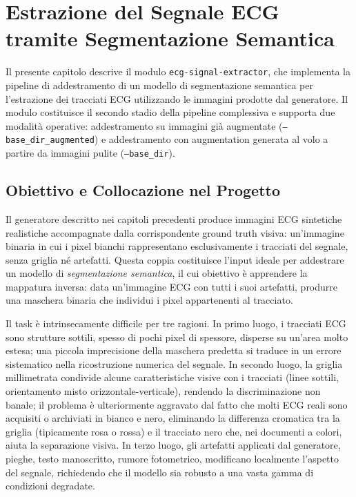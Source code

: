 \chapter{Estrazione del Segnale ECG tramite Segmentazione Semantica}

Il presente capitolo descrive il modulo \texttt{ecg-signal-extractor}, che implementa la pipeline di addestramento di un modello di segmentazione semantica per l'estrazione dei tracciati ECG utilizzando le immagini prodotte dal generatore. Il modulo costituisce il secondo stadio della pipeline complessiva e supporta due modalità operative: addestramento su immagini già augmentate (\texttt{--base\_dir\_augmented}) e addestramento con augmentation generata al volo a partire da immagini pulite (\texttt{--base\_dir}).

\section{Obiettivo e Collocazione nel Progetto}

Il generatore descritto nei capitoli precedenti produce immagini ECG sintetiche realistiche accompagnate dalla corrispondente ground truth visiva: un'immagine binaria in cui i pixel bianchi rappresentano esclusivamente i tracciati del segnale, senza griglia né artefatti. Questa coppia costituisce l'input ideale per addestrare un modello di \textit{segmentazione semantica}, il cui obiettivo è apprendere la mappatura inversa: data un'immagine ECG con tutti i suoi artefatti, produrre una maschera binaria che individui i pixel appartenenti al tracciato.

Il task è intrinsecamente difficile per tre ragioni. In primo luogo, i tracciati ECG sono strutture sottili, spesso di pochi pixel di spessore, disperse su un'area molto estesa; una piccola imprecisione della maschera predetta si traduce in un errore sistematico nella ricostruzione numerica del segnale. In secondo luogo, la griglia millimetrata condivide alcune caratteristiche visive con i tracciati (linee sottili, orientamento misto orizzontale-verticale), rendendo la discriminazione non banale; il problema è ulteriormente aggravato dal fatto che molti ECG reali sono acquisiti o archiviati in bianco e nero, eliminando la differenza cromatica tra la griglia (tipicamente rosa o rossa) e il tracciato nero che, nei documenti a colori, aiuta la separazione visiva. In terzo luogo, gli artefatti applicati dal generatore, pieghe, testo manoscritto, rumore fotometrico, modificano localmente l'aspetto del segnale, richiedendo che il modello sia robusto a una vasta gamma di condizioni degradate.

